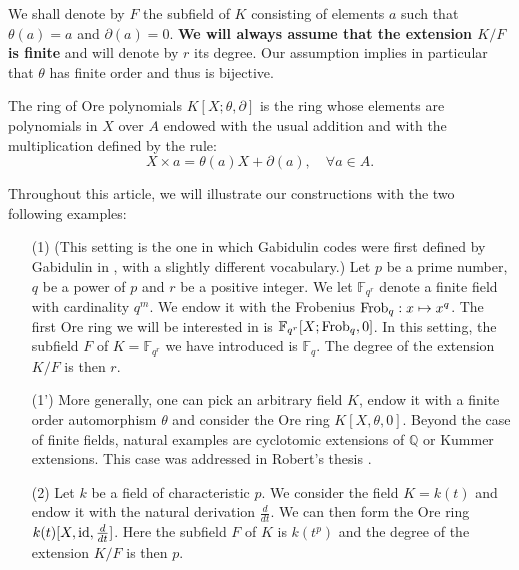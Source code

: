 \documentclass[a4paper]{llncs}
\newcommand{\QQ}{\mathbb Q}
\newcommand{\FF}{\mathbb F}
\newcommand{\id}{\textrm{\rm id}}
\newcommand{\Frob}{\textrm{\rm Frob}}
\begin{document}
We shall denote by $F$ the subfield of $K$ consisting of elements
$a$ such that $\theta(a) = a$ and $\partial(a) = 0$. 
\textbf{We will always assume that the extension $K/F$ is finite}
and will denote by $r$ its degree. Our assumption implies in particular 
that $\theta$ has finite order and thus is bijective.


\begin{definition}
The ring of Ore polynomials $K[X; \theta, \partial]$ is the ring 
whose elements are polynomials in $X$ over $A$ endowed with the usual 
addition and with the multiplication defined by the rule:
$$X \times a = \theta(a)X + \partial(a), \quad \forall a \in A.$$
%
%
\end{definition}

{\small
\begin{example}
\label{ex:Ore}
Throughout this article, we will illustrate our constructions 
with the two following examples:
\begin{itemize}
\renewcommand{\itemsep}{1ex}
\item[(1)] (This setting is the one in which Gabidulin codes were
first defined by Gabidulin in \cite{gabidulin}, with a slightly different
vocabulary.)
Let $p$ be a prime number, $q$ be a power of $p$ and $r$
be a positive integer. We let $\FF_{q^r}$ denote a finite field
with cardinality $q^m$. We endow it with the Frobenius $\Frob_q :
x \mapsto x^q$. The first Ore ring we will be interested in is
$\FF_{q^r}[X ; \Frob_q, 0]$. In this setting, the subfield $F$ of 
$K = \FF_{q^r}$ we have introduced is $\FF_q$. The degree of the
extension $K/F$ is then $r$.
\item[(1')] More generally, one can pick an arbitrary field $K$,
endow it with a finite order automorphism $\theta$ and consider the
Ore ring $K[X,\theta,0]$. Beyond the case of finite fields, natural
examples are cyclotomic extensions of $\QQ$ or Kummer extensions.
This case was addressed in Robert's thesis \cite{robert}.
\item[(2)] Let $k$ be a field of characteristic $p$. We consider the field 
$K = k(t)$ and endow it with the natural derivation $\frac d{dt}$. We can 
then form the Ore ring $k(t)[X,\id,\frac d{dt}]$. Here the subfield $F$ 
of $K$ is $k(t^p)$ and the degree of the extension $K/F$ is then $p$.
\end{itemize}
\end{example}}
\end{document}
